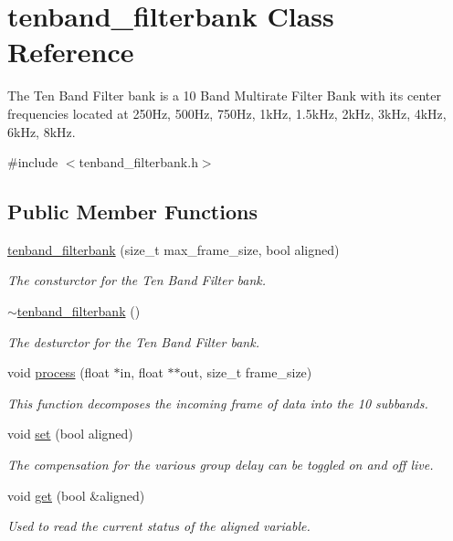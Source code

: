 \hypertarget{classtenband__filterbank}{}\section{tenband\+\_\+filterbank Class Reference}
\label{classtenband__filterbank}


The Ten Band Filter bank is a 10 Band Multirate Filter Bank with its center frequencies located at 250\+Hz, 500\+Hz, 750\+Hz, 1k\+Hz, 1.\+5k\+Hz, 2k\+Hz, 3k\+Hz, 4k\+Hz, 6k\+Hz, 8k\+Hz.  




{\ttfamily \#include $<$tenband\+\_\+filterbank.\+h$>$}

\subsection*{Public Member Functions}
\begin{DoxyCompactItemize}
\item 
\hyperlink{classtenband__filterbank_ab256b89ab03136482f899b7d821369b6}{tenband\+\_\+filterbank} (size\+\_\+t max\+\_\+frame\+\_\+size, bool aligned)
\begin{DoxyCompactList}\small\item\em The consturctor for the Ten Band Filter bank. \end{DoxyCompactList}\item 
\mbox{\label{classtenband__filterbank_a1a197b127d5f9a0e7a8c964d0aad24af}} 
\hyperlink{classtenband__filterbank_a1a197b127d5f9a0e7a8c964d0aad24af}{$\sim$tenband\+\_\+filterbank} ()
\begin{DoxyCompactList}\small\item\em The desturctor for the Ten Band Filter bank. \end{DoxyCompactList}\item 
void \hyperlink{classtenband__filterbank_a2368544882712253bb5c220cc4517bd4}{process} (float $\ast$in, float $\ast$$\ast$out, size\+\_\+t frame\+\_\+size)
\begin{DoxyCompactList}\small\item\em This function decomposes the incoming frame of data into the 10 subbands. \end{DoxyCompactList}\item 
void \hyperlink{classtenband__filterbank_a170a3e7896129748d8b33b7adbf44866}{set} (bool aligned)
\begin{DoxyCompactList}\small\item\em The compensation for the various group delay can be toggled on and off live. \end{DoxyCompactList}\item 
void \hyperlink{classtenband__filterbank_a1bc3d0099acfa8cabccccdec579abeed}{get} (bool \&aligned)
\begin{DoxyCompactList}\small\item\em Used to read the current status of the aligned variable. \end{DoxyCompactList}\end{DoxyCompactItemize}


